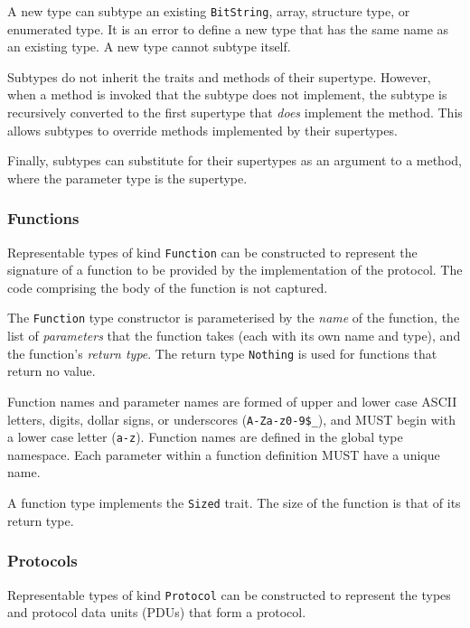 \documentclass[10pt,twocolumn,a4paper]{article}
\newcommand{\code}[1]{\texttt{#1}}
\begin{document}
A new type can subtype an existing \code{BitString},
array, structure type, or enumerated type. It is an error to define a new
type that has the same name as an existing type. A new type cannot subtype
itself.

Subtypes do not inherit the traits and methods of their supertype. However,
when a method is invoked that the subtype does not implement, the subtype is
recursively converted to the first supertype that \emph{does} implement the 
method. This allows subtypes to override methods implemented by their
supertypes.

Finally, subtypes can substitute for their supertypes as an argument to a
method, where the parameter type is the supertype.

\subsubsection{Functions}
\label{sec:functions}

Representable types of kind \code{Function} can be constructed to represent
the signature of a function to be provided by the implementation of
the protocol. The code comprising the body of the function is not captured. 

The \code{Function} type constructor is parameterised by the \emph{name} of
the function, the list of \emph{parameters} that the function takes (each
with its own name and type), and the function's \emph{return type}.
The return type \code{Nothing} is used for functions that return no value.

Function names and parameter names are formed of upper and lower case ASCII
letters, digits, dollar signs, or underscores (\code{A-Za-z0-9\$\_}), and
MUST begin with a lower case letter (\code{a-z}).
Function names are defined in the global type namespace.
Each parameter within a function definition MUST have a unique name.

A function type implements the \code{Sized} trait. The size of the function is that of
its return type.

\subsubsection{Protocols}

Representable types of kind \code{Protocol} can be constructed to represent
the types and protocol data units (PDUs) that form a protocol.
\end{document}

